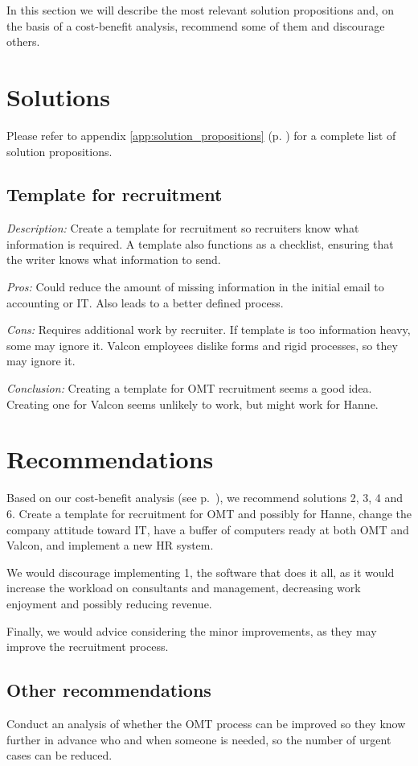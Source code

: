 In this section we will describe the most relevant solution propositions and, on the basis of a cost-benefit analysis, recommend some of them and discourage others.

\section{Solutions}
Please refer to appendix \ref{app:solution_propositions} (p. \pageref{app:solution_propositions}) for a complete list of solution propositions.

\subsection{Template for recruitment}
\emph{Description:} Create a template for recruitment so recruiters know what information is required. A template also functions as a checklist, ensuring that the writer knows what information to send.

\emph{Pros:} Could reduce the amount of missing information in the initial email to accounting or IT. 
Also leads to a better defined process.

\emph{Cons:} Requires additional work by recruiter. 
If template is too information heavy, some may ignore it.
Valcon employees dislike forms and rigid processes, so they may ignore it.

\emph{Conclusion:} Creating a template for OMT recruitment seems a good idea.
Creating one for Valcon seems unlikely to work, but might work for Hanne.

\section{Recommendations}
Based on our cost-benefit analysis (see p.~\pageref{app:cost_benefit_analysis}), we recommend solutions 2, 3, 4 and 6.
Create a template for recruitment for OMT and possibly for Hanne, change the company attitude toward IT, have a buffer of computers ready at both OMT and Valcon, and implement a new HR system.

We would discourage implementing 1, the software that does it all, as it would increase the workload on consultants and management, decreasing work enjoyment and possibly reducing revenue.

Finally, we would advice considering the minor improvements, as they may improve the recruitment process.

\subsection{Other recommendations}
Conduct an analysis of whether the OMT process can be improved so they know further in advance who and when someone is needed, so the number of urgent cases can be reduced.